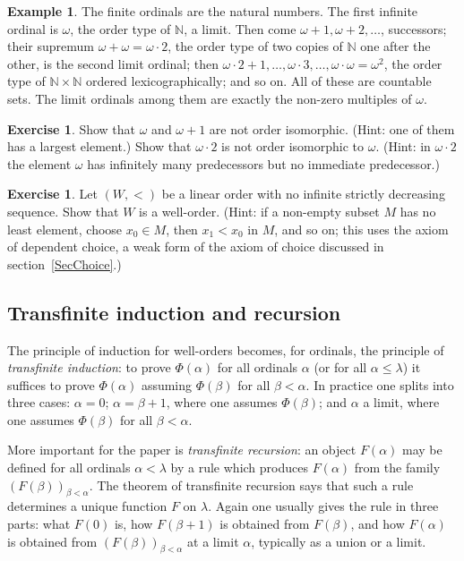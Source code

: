 \documentclass[12pt]{article}
\theoremstyle{definition}
\newtheorem{example}[theorem]{Example}
\newtheorem{exercise}[theorem]{Exercise}
\theoremstyle{remark}
\newcommand{\NN}{\mathbb{N}}
\begin{document}
\begin{example}\label{SmallOrdinals} The finite ordinals are the natural
    numbers. The first infinite ordinal is $\omega$, the order type of $\NN$,
    a limit. Then come $\omega+1,\omega+2,\ldots$, successors; their supremum
    $\omega+\omega=\omega\cdot 2$, the order type of two copies of $\NN$ one
    after the other, is the second limit ordinal; then
    $\omega\cdot 2+1,\ldots,\omega\cdot 3,\ldots,\omega\cdot\omega=\omega^2$, the
    order type of $\NN\times\NN$ ordered lexicographically; and so on. All of
    these are countable sets. The limit ordinals among them are exactly the
    non-zero multiples of $\omega$.
\end{example}

\begin{exercise} Show that $\omega$ and $\omega+1$ are not order isomorphic.
    (Hint: one of them has a largest element.) Show that $\omega\cdot 2$ is
    not order isomorphic to $\omega$. (Hint: in $\omega\cdot 2$ the element
    $\omega$ has infinitely many predecessors but no immediate predecessor.)
\end{exercise}

\begin{exercise} Let $(W,<)$ be a linear order with no infinite strictly
    decreasing sequence. Show that $W$ is a well-order. (Hint: if a non-empty
    subset $M$ has no least element, choose $x_0\in M$, then $x_1<x_0$ in
    $M$, and so on; this uses the axiom of dependent choice, a weak form of the axiom of
    choice discussed in section~\ref{SecChoice}.)
\end{exercise}

\subsection{Transfinite induction and recursion}

The principle of induction for well-orders becomes, for ordinals, the
principle of \emph{transfinite induction}: to prove $\Phi(\alpha)$ for all
ordinals $\alpha$ (or for all $\alpha\leq\lambda$) it suffices to prove
$\Phi(\alpha)$ assuming $\Phi(\beta)$ for all $\beta<\alpha$. In practice one
splits into three cases: $\alpha=0$; $\alpha=\beta+1$, where one assumes
$\Phi(\beta)$; and $\alpha$ a limit, where one assumes $\Phi(\beta)$ for all
$\beta<\alpha$.

More important for the paper is \emph{transfinite recursion}: an object
$F(\alpha)$ may be defined for all ordinals $\alpha<\lambda$ by a rule which
produces $F(\alpha)$ from the family ${(F(\beta))}_{\beta<\alpha}$. The
theorem of transfinite recursion says that such a rule determines a unique
function $F$ on $\lambda$. Again one usually gives the rule in three parts:
what $F(0)$ is, how $F(\beta+1)$ is obtained from $F(\beta)$, and how
$F(\alpha)$ is obtained from ${(F(\beta))}_{\beta<\alpha}$ at a limit
$\alpha$, typically as a union or a limit.
\end{document}
